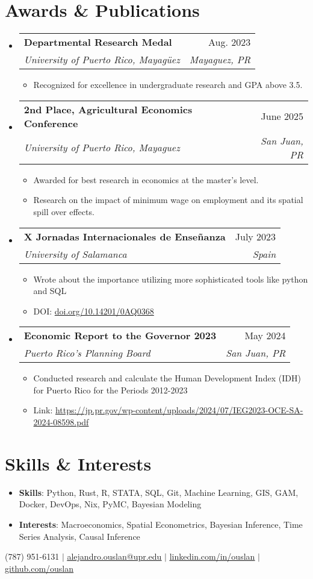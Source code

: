 \documentclass[letterpaper,11pt]{article}
\makeatletter
\newcommand{\resumeItem}[1]{\item\small{{#1 \vspace{-2pt}}}}
\newcommand{\resumeSubheading}[4]{
  \vspace{-2pt}\item
    \begin{tabular*}{0.97\textwidth}[t]{l@{\extracolsep{\fill}}r}
      \textbf{#1} & #2 \\
      \textit{\small#3} & \textit{\small #4} \\
    \end{tabular*}\vspace{-7pt}
}
\newcommand{\resumeSubHeadingListStart}{\begin{itemize}[leftmargin=0.15in, label={}]}
\newcommand{\resumeSubHeadingListEnd}{\end{itemize}}
\newcommand{\resumeItemListStart}{\begin{itemize}}
\newcommand{\resumeItemListEnd}{\end{itemize}\vspace{-5pt}}
\makeatother
\begin{document}
\section{Awards \& Publications}
\resumeSubHeadingListStart

\resumeSubheading
{Departmental Research Medal}{Aug. 2023}
{University of Puerto Rico, Mayagüez}{Mayaguez, PR}
\resumeItemListStart
\resumeItem{Recognized for excellence in undergraduate research and GPA above 3.5.}
\resumeItemListEnd

\resumeSubheading
{2nd Place, Agricultural Economics Conference}{June 2025}
{University of Puerto Rico, Mayaguez}{San Juan, PR}
\resumeItemListStart
\resumeItem{Awarded for best research in economics at the master’s level.}
\resumeItem{Research on the impact of minimum wage on employment and its spatial spill over effects.}
\resumeItemListEnd

\resumeSubheading
{X Jornadas Internacionales de Enseñanza}{July 2023}
{University of Salamanca}{Spain}
\resumeItemListStart
\resumeItem{Wrote about the importance utilizing more sophisticated tools like python and SQL}
\resumeItem{DOI: \href{https://doi.org/10.14201/0AQ0368}{doi.org/10.14201/0AQ0368}}
\resumeItemListEnd

\resumeSubheading
{Economic Report to the Governor 2023}{May 2024}
{Puerto Rico's Planning Board}{San Juan, PR}
\resumeItemListStart
\resumeItem{Conducted research and calculate the Human Development Index (IDH) for Puerto Rico for the Periods 2012-2023}
\resumeItem{Link: \href{https://jp.pr.gov/wp-content/uploads/2024/07/IEG2023-OCE-SA-2024-08598.pdf}{https://jp.pr.gov/wp-content/uploads/2024/07/IEG2023-OCE-SA-2024-08598.pdf}}
\resumeItemListEnd

\resumeSubHeadingListEnd

\section{Skills \& Interests}
\begin{itemize}[leftmargin=0.15in, label={}]
	\item \small{
		      \textbf{Skills}: Python, Rust, R, STATA, SQL, Git, Machine Learning, GIS, GAM, Docker, DevOps, Nix, PyMC, Bayesian Modeling
	      }
	\item \small{
		      \textbf{Interests}: Macroeconomics, Spatial Econometrics, Bayesian Inference, Time Series Analysis, Causal Inference
	      }
\end{itemize}

\begin{center}
	\small (787) 951-6131 $|$
	\href{mailto:alejandro.ouslan@upr.edu}{\underline{alejandro.ouslan@upr.edu}} $|$
	\href{https://linkedin.com/in/ouslan}{\underline{linkedin.com/in/ouslan}} $|$
	\href{https://github.com/ouslan}{\underline{github.com/ouslan}}
\end{center}
\end{document}
